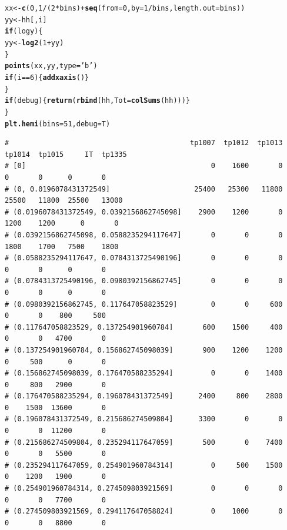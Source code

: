 \documentclass{article}\usepackage[]{graphicx}\usepackage[]{color}
\makeatletter
\newcommand{\hlnum}[1]{\textcolor[rgb]{0.686,0.059,0.569}{#1}}%
\newcommand{\hlstr}[1]{\textcolor[rgb]{0.192,0.494,0.8}{#1}}%
\newcommand{\hlopt}[1]{\textcolor[rgb]{0,0,0}{#1}}%
\newcommand{\hlstd}[1]{\textcolor[rgb]{0.345,0.345,0.345}{#1}}%
\newcommand{\hlkwa}[1]{\textcolor[rgb]{0.161,0.373,0.58}{\textbf{#1}}}%
\newcommand{\hlkwb}[1]{\textcolor[rgb]{0.69,0.353,0.396}{#1}}%
\newcommand{\hlkwc}[1]{\textcolor[rgb]{0.333,0.667,0.333}{#1}}%
\newcommand{\hlkwd}[1]{\textcolor[rgb]{0.737,0.353,0.396}{\textbf{#1}}}%
\newenvironment{kframe}{%
 \def\at@end@of@kframe{}%
 \ifinner\ifhmode%
  \def\at@end@of@kframe{\end{minipage}}%
  \begin{minipage}{\columnwidth}%
 \fi\fi%
 \def\FrameCommand##1{\hskip\@totalleftmargin \hskip-\fboxsep
 \colorbox{shadecolor}{##1}\hskip-\fboxsep
     \hskip-\linewidth \hskip-\@totalleftmargin \hskip\columnwidth}%
 \MakeFramed {\advance\hsize-\width
   \@totalleftmargin\z@ \linewidth\hsize
   \@setminipage}}%
 {\par\unskip\endMakeFramed%
 \at@end@of@kframe}
\newenvironment{knitrout}{}{} %
\makeatother
\begin{document}
\begin{knitrout}
\begin{kframe}
\begin{alltt}
    \hlstd{xx} \hlkwb{<-} \hlkwd{c}\hlstd{(}\hlnum{0}\hlstd{,}\hlnum{1}\hlopt{/}\hlstd{(}\hlnum{2}\hlopt{*}\hlstd{bins)}\hlopt{+}\hlkwd{seq}\hlstd{(}\hlkwc{from}\hlstd{=}\hlnum{0}\hlstd{,} \hlkwc{by}\hlstd{=}\hlnum{1}\hlopt{/}\hlstd{bins,}\hlkwc{length.out}\hlstd{=bins))}
    \hlstd{yy} \hlkwb{<-} \hlstd{hh[,i]}
    \hlkwa{if}\hlstd{(logy)\{}
      \hlstd{yy} \hlkwb{<-} \hlkwd{log2}\hlstd{(}\hlnum{1}\hlopt{+}\hlstd{yy)}
    \hlstd{\}}
    \hlkwd{points}\hlstd{(xx, yy,} \hlkwc{type}\hlstd{=}\hlstr{'b'}\hlstd{)}
    \hlkwa{if}\hlstd{(i}\hlopt{==}\hlnum{6}\hlstd{)\{}\hlkwd{addxaxis}\hlstd{()\}}
  \hlstd{\}}
  \hlkwa{if}\hlstd{(debug)\{}\hlkwd{return}\hlstd{(}\hlkwd{rbind}\hlstd{(hh,}\hlkwc{Tot}\hlstd{=}\hlkwd{colSums}\hlstd{(hh)))\}}
\hlstd{\}}
\hlkwd{plt.hemi}\hlstd{(}\hlkwc{bins}\hlstd{=}\hlnum{51}\hlstd{,}\hlkwc{debug}\hlstd{=T)}
\end{alltt}
\begin{verbatim}
#                                           tp1007  tp1012  tp1013  tp1014  tp1015     IT  tp1335
# [0]                                            0    1600       0       0       0      0       0
# (0, 0.0196078431372549]                    25400   25300   11800   25500   11800  25500   13000
# (0.0196078431372549, 0.0392156862745098]    2900    1200       0    1200    1200      0       0
# (0.0392156862745098, 0.0588235294117647]       0       0       0    1800    1700   7500    1800
# (0.0588235294117647, 0.0784313725490196]       0       0       0       0       0      0       0
# (0.0784313725490196, 0.0980392156862745]       0       0       0       0       0      0       0
# (0.0980392156862745, 0.117647058823529]        0       0     600       0       0    800     500
# (0.117647058823529, 0.137254901960784]       600    1500     400       0       0   4700       0
# (0.137254901960784, 0.156862745098039]       900    1200    1200       0     500      0       0
# (0.156862745098039, 0.176470588235294]         0       0    1400       0     800   2900       0
# (0.176470588235294, 0.196078431372549]      2400     800    2800       0    1500  13600       0
# (0.196078431372549, 0.215686274509804]      3300       0       0       0       0  11200       0
# (0.215686274509804, 0.235294117647059]       500       0    7400       0       0   5500       0
# (0.235294117647059, 0.254901960784314]         0     500    1500       0    1200   1900       0
# (0.254901960784314, 0.274509803921569]         0       0       0       0       0   7700       0
# (0.274509803921569, 0.294117647058824]         0    1000       0       0       0   8800       0

\end{verbatim}
\end{kframe}
\end{knitrout}
\end{document}
